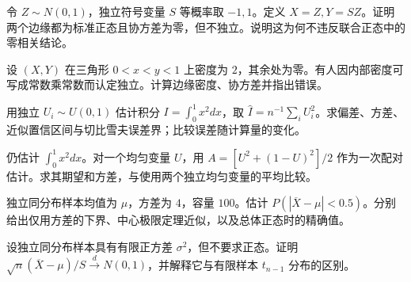 \begin{exercise}\label{q:B17.15}
令 $Z\sim N(0,1)$，独立符号变量 $S$ 等概率取 $-1,1$。定义 $X=Z,Y=SZ$。证明两个边缘都为标准正态且协方差为零，但不独立。说明这为何不违反联合正态中的零相关结论。\par{}\end{exercise}

\begin{exercise}[支撑集破坏独立性]\label{q:B17.16}
设 $(X,Y)$ 在三角形 $0<x<y<1$ 上密度为 $2$，其余处为零。有人因内部密度可写成常数乘常数而认定独立。计算边缘密度、协方差并指出错误。\par{}\end{exercise}

\begin{exercise}[蒙特卡洛积分与标准误]\label{q:B17.17}
用独立 $U_i\sim U(0,1)$ 估计积分 $I=\int_0^1x^2dx$，取 $\widehat I=n^{-1}\sum_iU_i^2$。求偏差、方差、近似置信区间与切比雪夫误差界；比较误差随计算量的变化。\par{}\end{exercise}

\begin{exercise}[反向变量的方差缩减]\label{q:B17.18}
仍估计 $\int_0^1x^2dx$。对一个均匀变量 $U$，用 $A=[U^2+(1-U)^2]/2$ 作为一次配对估计。求其期望和方差，与使用两个独立均匀变量的平均比较。\par{}\end{exercise}

\begin{exercise}[切比雪夫界与正态近似的角色]\label{q:B17.19}
独立同分布样本均值为 $\mu$，方差为 $4$，容量 $100$。估计 $P(|\overline X-\mu|<0.5)$。分别给出仅用方差的下界、中心极限定理近似，以及总体正态时的精确值。\par{}\end{exercise}

\begin{exercise}[学生化与斯卢茨基定理]\label{q:B17.20}
设独立同分布样本具有有限正方差 $\sigma^2$，但不要求正态。证明 $\sqrt n(\overline X-\mu)/S\xrightarrow dN(0,1)$，并解释它与有限样本 $t_{n-1}$ 分布的区别。\par{}\end{exercise}

